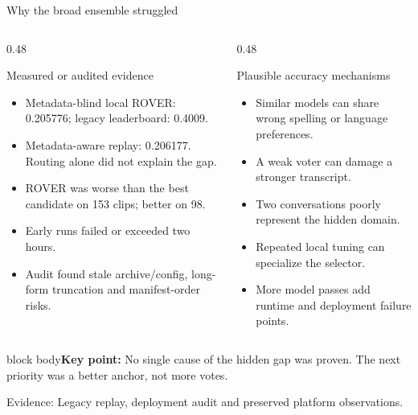 \documentclass[aspectratio=169,11pt]{beamer}
\newcommand{\takeaway}[1]{\vfill\begin{beamercolorbox}[sep=2mm,wd=\linewidth]{block body}\small\textbf{Key point:} #1\end{beamercolorbox}}
\newcommand{\evidence}[1]{\vspace{1mm}\par{\tiny\color{slate}Evidence: #1\par}}
\begin{document}
\begin{frame}{Why the broad ensemble struggled}
\begin{columns}[T]
\begin{column}{0.48\textwidth}
\begin{block}{Measured or audited evidence}
\small\begin{itemize}\item Metadata-blind local ROVER: 0.205776; legacy leaderboard: 0.4009.
\item Metadata-aware replay: 0.206177. Routing alone did not explain the gap.
\item ROVER was worse than the best candidate on 153 clips; better on 98.
\item Early runs failed or exceeded two hours.
\item Audit found stale archive/config, long-form truncation and manifest-order risks.
\end{itemize}
\end{block}
\end{column}
\begin{column}{0.48\textwidth}
\begin{alertblock}{Plausible accuracy mechanisms}
\small\begin{itemize}\item Similar models can share wrong spelling or language preferences.
\item A weak voter can damage a stronger transcript.
\item Two conversations poorly represent the hidden domain.
\item Repeated local tuning can specialize the selector.
\item More model passes add runtime and deployment failure points.
\end{itemize}
\end{alertblock}
\end{column}
\end{columns}
\takeaway{No single cause of the hidden gap was proven. The next priority was a better anchor, not more votes.}
\evidence{Legacy replay, deployment audit and preserved platform observations.}
\end{frame}
\end{document}
